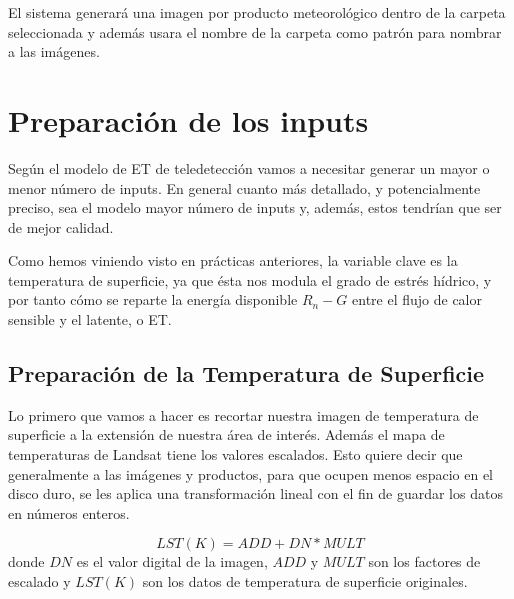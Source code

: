 \documentclass[a4paper,11pt]{article}
\begin{document}
El sistema generará una imagen por producto meteorológico dentro de la carpeta seleccionada y además usara el nombre de la carpeta como patrón para nombrar a las imágenes.

\section{Preparación de los inputs}
  Según el modelo de ET de teledetección vamos a necesitar generar un mayor o menor número de inputs. En general cuanto más detallado, y potencialmente preciso, sea el modelo mayor número de inputs y, además, estos tendrían que ser de mejor calidad.

  Como hemos viniendo visto en prácticas anteriores, la variable clave es la temperatura de superficie, ya que ésta nos modula el grado de estrés hídrico, y por tanto cómo se reparte la energía disponible $R_n - G$ entre el flujo de calor sensible y el latente, o ET.

  \subsection{Preparación de la Temperatura de Superficie}
    Lo primero que vamos a hacer es recortar nuestra imagen de temperatura de superficie a la extensión de nuestra área de interés. Además el mapa de temperaturas de Landsat tiene los valores escalados. Esto quiere decir que generalmente a las imágenes y productos, para que ocupen menos espacio en el disco duro, se les aplica una transformación lineal con el fin de guardar los datos en números enteros. 
    
      \begin{equation}
        LST\left(K\right) = ADD + DN*MULT 
      \end{equation}
    donde $DN$ es el valor digital de la imagen, $ADD$ y $MULT$ son los factores de escalado y $LST\left(K\right)$ son los datos de temperatura de superficie originales.
    
\end{document}
